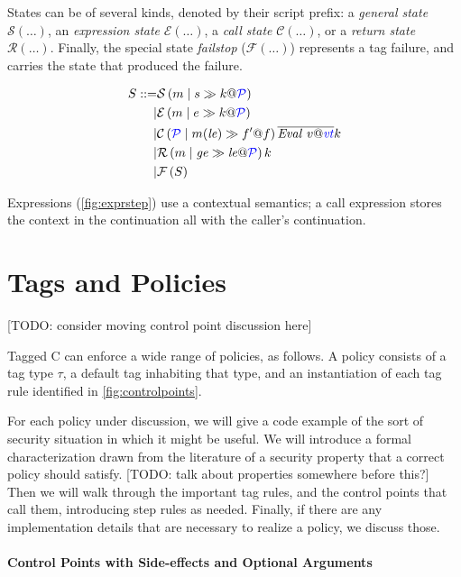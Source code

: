 \documentclass[acmsmall,review,anonymous]{acmart}\settopmatter{printfolios=true,printccs=false,printacmref=false}
\begin{document}
States can be of several kinds, denoted by their script prefix: a {\em general state} \(\mathcal{S}(\dots)\),
an {\em expression state} \(\mathcal{E}(\dots)\), a {\em call state} \(\mathcal{C}(\dots)\), or a
{\em return state} \(\mathcal{R}(\dots)\). Finally, the special state {\em failstop} (\(\mathcal{F}(\dots)\))
represents a tag failure, and carries the state that produced the failure.

\[\begin{aligned}
S ::= & \sstate{\PCT}{\mem}{\stmt}{\cont} \\
| & \estate{\PCT}{\mem}{\expr}{\cont} \\
| & \cstate{f}{\PCT}{\mem}{\lenv}{f'}{\overline{\val{v}{\vt}}}{\cont} \\
| & \rstate{\PCT}{\mem}{\genv}{\lenv}{\val{v}{\vt}}{\cont} \\
| & \fstate{S} \\
\end{aligned}\]

Expressions (\cref{fig:exprstep}) use a contextual semantics; a call expression stores the
context in the continuation all with the caller's continuation.

\section{Tags and Policies}

[TODO: consider moving control point discussion here]

Tagged C can enforce a wide range of policies, as follows.
A policy consists of a tag type \(\tau\), a default tag inhabiting that type, and an instantiation
of each tag rule identified in \cref{fig:controlpoints}.

For each policy under discussion, we will give a code example of the sort of security
situation in which it might be useful. We will introduce a formal characterization drawn
from the literature of a security property that a correct policy should satisfy.
[TODO: talk about properties somewhere before this?]
Then we will walk through the important tag rules, and the control points that call them,
introducing step rules as needed. Finally, if there are any implementation details that
are necessary to realize a policy, we discuss those.

\paragraph*{Control Points with Side-effects and Optional Arguments}
\end{document}
